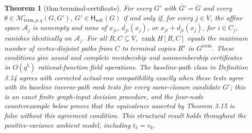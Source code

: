 \documentclass{article}
\newtheorem{theorem}{Theorem}
\begin{document}
\begin{theorem}[thm:terminal-certificate]\label{thm:terminal-certificate}
For every \(G'\) with \(\overline{G'}=\overline G\) and every \(\theta\in\mathcal M^{\circ}_{\mathrm{term},p,q}(G,G')\), \(G'\in\mathsf H_{\mathrm{soft}}(G)\) if and only if, for every \(j\in V\), the affine space \(\mathcal A_j\) is nonempty and none of \(x_{ji}\), \(d_{ji}(x_j)\), or \(x_{ji}+d_{ji}(x_j)\), for \(i\in C_j\), vanishes identically on \(\mathcal A_j\). For all \(R,C\subseteq V\), \(\operatorname{rank}H[R,C]\) equals the maximum number of vertex-disjoint paths from \(C\) to terminal copies \(R^{\star}\) in \(G^{\mathrm{term}}\). These conditions give sound and complete membership and nonmembership certificates in \(O(q^5)\) rational-function field operations. The baseline-path class in Definition 3.14 agrees with corrected actual-row compatibility exactly when these tests agree with its baseline inverse-path rank tests for every same-closure candidate \(G'\); this is an exact finite graph-input decision procedure, and the four-node counterexample below proves that the equivalence asserted by Theorem 3.15 is false without this agreement condition. This structural result holds throughout the positive-variance ambient model, including \(t_k=v_k\).
\end{theorem}
\end{document}
